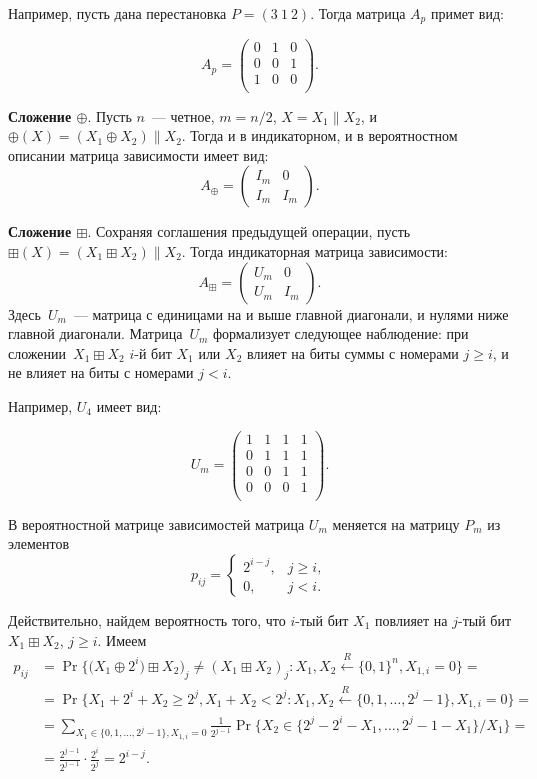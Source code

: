 \documentclass[a4paper,12pt]{report}
\theoremstyle{plain} %
\theoremstyle{definition}
\theoremstyle{remark}
\begin{document}
\begin{large}
Например, пусть дана перестановка $P = (3~1~2)$. Тогда матрица $A_p$ примет вид:

$$
A_p = 
\begin{pmatrix} 
0 & 1 & 0\\ 
0 & 0 & 1\\ 
1 & 0 & 0\\
\end{pmatrix}.
$$

{\bf Сложение $\oplus$}.
Пусть $n$~--- четное, $m=n/2$,
$X=X_1\parallel X_2$, 
и $\oplus(X)=(X_1\oplus X_2)\parallel X_2$.
Тогда и в индикаторном, и в вероятностном описании 
матрица зависимости имеет вид:
$$
A_\oplus = 
\begin{pmatrix} 
I_m & 0\\ 
I_m & I_m 
\end{pmatrix}.
$$

{\bf Сложение $\boxplus$}.
Сохраняя соглашения предыдущей операции,
пусть $\boxplus(X)=(X_1\boxplus X_2)\parallel X_2$.
Тогда индикаторная матрица зависимости:
$$
A_\boxplus = 
\begin{pmatrix} 
U_m & 0\\ 
U_m & I_m 
\end{pmatrix}.
$$
Здесь~$U_m$~--- матрица с единицами на и выше главной диагонали,
и нулями ниже главной диагонали. Матрица~$U_m$ формализует 
следующее наблюдение: при сложении~$X_1\boxplus X_2$
$i$-й бит $X_1$ или $X_2$ влияет на биты суммы с номерами $j\geq i$,
и не влияет на биты с номерами $j<i$.

Например, $U_4$ имеет вид:

$$
U_m = 
\begin{pmatrix} 
1 & 1 & 1 & 1\\ 
0 & 1 & 1 & 1\\ 
0 & 0 & 1 & 1\\
0 & 0 & 0 & 1\\
\end{pmatrix}.
$$

В вероятностной матрице зависимостей матрица 
$U_m$ меняется на матрицу $P_m$ из элементов 
$$
p_{ij}=\begin{cases}
2^{i-j}, & j\geq i,\\
0,       & j< i.
\end{cases}
$$

Действительно,
найдем вероятность того, что $i$-тый бит $X_1$ повлияет на $j$-тый бит
$X_1\boxplus X_2$, $j\geq i$.
Имеем
\begin{align*}
p_{ij}
&= 
\Pr\bigg\{\big(X_1 \oplus 2^i)\boxplus X_2\big)_j \neq (X_1 \boxplus X_2)_j\colon
X_1, X_2\stackrel{R}\leftarrow \{0,1\}^n, X_{1,i} = 0\bigg\} =\\
&=
\Pr\bigg\{X_1+2^i+X_2\geq 2^j, X_1 + X_2 < 2^j\colon 
X_1, X_2\stackrel{R}\leftarrow\{0,1,\ldots,2^j-1\}, X_{1,i} = 0\bigg\}=\\
&=
\sum_{X_1\in \{0,1,\ldots,2^j-1\}, X_{1,i}=0}
\frac{1}{2^{j-1}}\Pr\bigg\{X_2 \in \{2^j-2^i-X_1,\ldots,2^j-1-X_1\}/X_1\bigg\} =\\
&=
\frac{2^{j-1}}{2^{j-1}}\cdot \frac{2^i}{2^j} = 2^{i-j}.
\end{align*}


\end{large}
\end{document}
